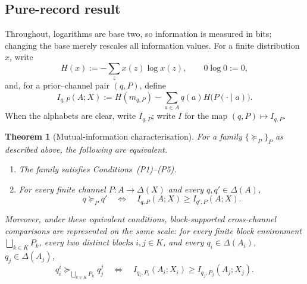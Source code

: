 \documentclass[11pt,a4paper]{article}
\newtheorem{theorem}{Theorem}
\theoremstyle{definition}
\newcommand{\Sh}{H}
\newcommand{\1}{\mathbf 1}
\begin{document}
\subsection{Pure-record result}

Throughout, logarithms are base two, so information is measured in bits; changing the base merely rescales all
information values.
For a finite distribution $x$, write
\[
\Sh(x):=-\sum_z x(z)\log x(z),
\qquad 0\log 0:=0,
\]
and, for a prior--channel pair $(q,P)$, define
\[
I_{q,P}(A;X)
:=
\Sh(m_{q,P})-\sum_{a\in A}q(a)\Sh\bigl(P(\cdot\mid a)\bigr).
\]
When the alphabets are clear, write $I_{q,P}$; write $I$ for the map $(q,P)\mapsto I_{q,P}$.

\begin{theorem}[Mutual-information characterisation]\label{pt:thm:main}
For a family $\{\succeq_P\}_P$ as described above, the following are equivalent.
\begin{enumerate}[label=\textup{(\roman*)},leftmargin=*]
\item The family satisfies Conditions~\textup{(P1)--(P5)}.
\item For every finite channel $P:A\to\Delta(X)$ and every $q,q'\in\Delta(A)$,
\[
q\succeq_P q'
\quad\Longleftrightarrow\quad
I_{q,P}(A;X)\ge I_{q',P}(A;X).
\]
\end{enumerate}
Moreover, under these equivalent conditions, block-supported cross-channel comparisons are represented on the same
scale: for every finite block environment $\bigsqcup_{k\in K}P_k$, every two distinct blocks $i,j\in K$, and every
$q_i\in\Delta(A_i)$, $q_j\in\Delta(A_j)$,
\[
q_i^i\succeq_{\bigsqcup_{k\in K}P_k}q_j^j
\quad\Longleftrightarrow\quad
I_{q_i,P_i}(A_i;X_i)\ge I_{q_j,P_j}(A_j;X_j).
\]
\end{theorem}
\end{document}

